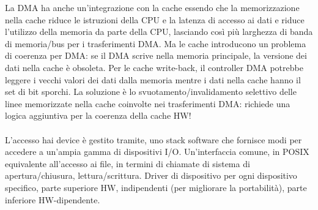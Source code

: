 \hspace{-15pt}La DMA ha anche un'integrazione con la cache essendo che la memorizzazione nella cache riduce le istruzioni della CPU e la latenza di accesso ai dati e riduce l'utilizzo della memoria da parte della CPU, lasciando così più larghezza di banda di memoria/bus per i trasferimenti DMA. Ma le cache introducono un problema di coerenza per DMA: se il DMA scrive nella memoria principale, la versione dei dati nella cache è obsoleta. Per le cache write-back, il controller DMA potrebbe leggere i vecchi valori dei dati dalla memoria mentre i dati nella cache hanno il set di bit sporchi. La soluzione è lo svuotamento/invalidamento selettivo delle linee memorizzate nella cache 
coinvolte nei trasferimenti DMA: richiede una logica aggiuntiva per la coerenza della cache HW!\\\\
L'accesso hai device è gestito tramite, uno stack software che fornisce modi per accedere a un'ampia gamma di dispositivi I/O. 
Un'interfaccia comune, in POSIX equivalente all'accesso ai file, in termini di chiamate di sistema 
di apertura/chiusura, lettura/scrittura. Driver di dispositivo per ogni dispositivo specifico, parte superiore HW, 
indipendenti (per migliorare la portabilità), parte inferiore HW-dipendente.


